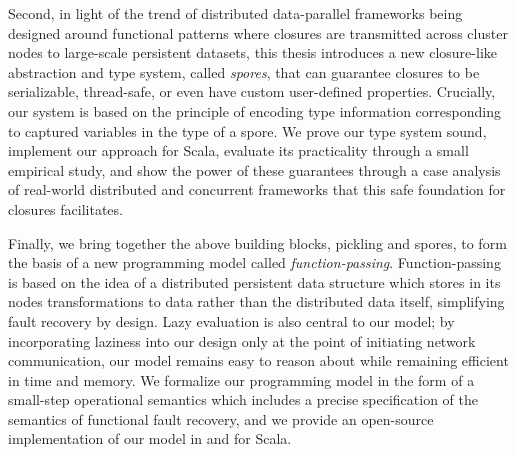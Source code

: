 Second, in light of the trend of distributed data-parallel frameworks
being designed around functional patterns where closures are transmitted across
cluster nodes to large-scale persistent datasets, this thesis introduces a new
closure-like abstraction and type system, called {\em spores}, that can
guarantee closures to be serializable, thread-safe, or even have custom
user-defined properties. Crucially, our system is based on the principle of
encoding type information corresponding to captured variables in the type of a
spore. We prove our type system sound, implement our approach for Scala,
evaluate its practicality through a small empirical study, and show the power of
these guarantees through a case analysis of real-world distributed and
concurrent frameworks that this safe foundation for closures facilitates.

\vspace{0.2cm}

Finally, we bring together the above building blocks, pickling and spores, to
form the basis of a new programming model called {\em function-passing}.
Function-passing is based on the idea of a distributed persistent data structure
which stores in its nodes transformations to data rather than the distributed
data itself, simplifying fault recovery by design. Lazy evaluation is also
central to our model; by incorporating laziness into our design only at the
point of initiating network communication, our model remains easy to reason
about while remaining efficient in time and memory. We formalize our programming
model in the form of a small-step operational semantics which includes a precise
specification of the semantics of functional fault recovery, and we provide an
open-source implementation of our model in and for Scala.












